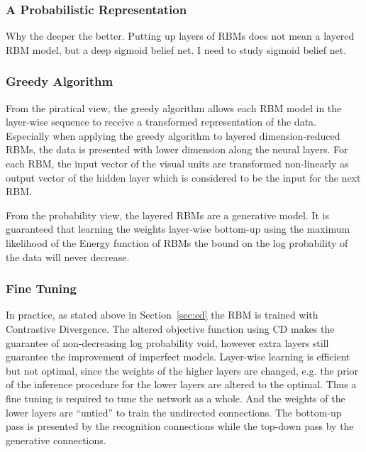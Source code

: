 	\subsubsection{A Probabilistic Representation}
		Why the deeper the better.
	 	Putting up layers of RBMs does not mean a layered RBM model, but a deep sigmoid belief net.
	 	I need to study sigmoid belief net.
	\subsubsection{Greedy Algorithm}
		From the piratical view, the greedy algorithm allows each RBM model in the layer-wise sequence to receive a transformed representation of the data.
		Especially when applying the greedy algorithm to layered dimension-reduced RBMs, the data is presented with lower dimension along the neural layers.
		For each RBM, the input vector of the visual units are transformed non-linearly as output vector of the hidden layer which is considered to be the input for the next RBM.
		
		From the probability view, the layered RBMs are a generative model.
		It is guaranteed that learning the weights layer-wise bottom-up using the maximum likelihood of the Energy function of RBMs the bound on the log probability of the data will never decrease. 
	\subsubsection{Fine Tuning}
		In practice, as stated above in Section~\ref{sec:cd} the RBM is trained with Contrastive Divergence.
			The altered objective function using CD makes the guarantee of non-decreasing log probability void, however extra layers still guarantee the improvement of imperfect models.
		Layer-wise learning is efficient but not optimal, since the weights of the higher layers are changed, e.g. the prior of the inference procedure for the lower layers are altered to the optimal.
		Thus a fine tuning is required to tune the network as a whole.
		And the weights of the lower layers are ``untied'' to train the undirected connections.
		The bottom-up pass is presented by the recognition connections while the top-down pass by the generative connections.
		
